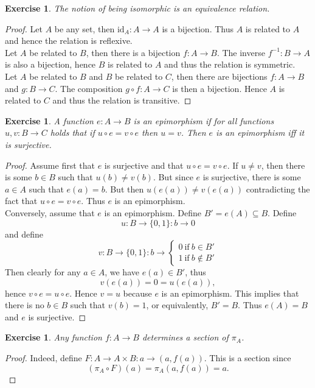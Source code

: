\documentclass[a4paper, 11pt]{book}
\theoremstyle{plain}
\newtheorem{exercise}[theorem]{Exercise}
\theoremstyle{plain}
\begin{document}
\begin{exercise}
The notion of being isomorphic is an equivalence relation.
\end{exercise}
\begin{proof}
Let $A$ be any set, then $\text{id}_A:A\rightarrow A$ is a bijection. Thus $A$ is related to $A$ and hence the relation is reflexive.\\
Let $A$ be related to $B$, then there is a bijection $f:A\rightarrow B$. The inverse $f^{-1}:B\rightarrow A$ is also a bijection, hence $B$ is related to $A$ and thus the relation is symmetric.\\
Let $A$ be related to $B$ and $B$ be related to $C$, then there are bijections $f:A\rightarrow B$ and $g:B\rightarrow C$. The composition $g\circ f:A\rightarrow C$ is then a bijection. Hence $A$ is related to $C$ and thus the relation is transitive.
\end{proof}

\begin{exercise}
A function $e:A\rightarrow B$ is an epimorphism if for all functions $u,v:B\rightarrow C$ holds that if $u\circ e= v\circ e$ then $u=v$. Then $e$ is an epimorphism iff it is surjective.
\end{exercise}
\begin{proof}
Assume first that $e$ is surjective and that $u\circ e = v\circ e$. If $u\neq v$, then there is some $b\in B$ such that $u(b)\neq v(b)$. But since $e$ is surjective, there is some $a\in A$ such that $e(a) = b$. But then $u(e(a)) \neq v(e(a))$ contradicting the fact that $u\circ e=v\circ e$. Thus $e$ is an epimorphism.\\
Conversely, assume that $e$ is an epimorphism. Define $B' = e(A)\subseteq B$. Define $$u:B\rightarrow \{0,1\}:b\rightarrow 0$$
and define
$$v:B\rightarrow \{0,1\}:b\rightarrow \left\{\begin{array}{ll}
0~\text{if}~b\in B'\\ 1~\text{if}~b\notin B'
\end{array}\right.$$
Then clearly for any $a\in A$, we have $e(a)\in B'$, thus
$$v(e(a)) = 0 = u(e(a)),$$
hence $v\circ e=u\circ e$. Hence $v=u$ because $e$ is an epimorphism. This implies that there is no $b\in B$ such that $v(b)=1$, or equivalently, $B'=B$. Thus $e(A)=B$ and $e$ is surjective.
\end{proof}

\begin{exercise}
Any function $f:A\rightarrow B$ determines a section of $\pi_A$.
\end{exercise}
\begin{proof}
Indeed, define $F:A\rightarrow A\times B:a\rightarrow (a,f(a))$. This is a section since
$$(\pi_A\circ F)(a) = \pi_A(a,f(a)) = a.$$
\end{proof}
\end{document}
